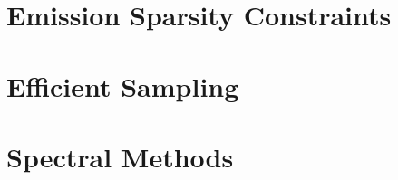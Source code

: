 \documentclass{article}
\begin{document}
\section{Emission Sparsity Constraints}

\section{Efficient Sampling}

\section{Spectral Methods}




\begin{appendix}
\begin{comment}
\section{Gradient Estimator Implementation}
In the log-semiring, addition is given by $\bigoplus = \LSE$ and multiplication
by $\bigotimes = +$.
Consider the linear chain CRF, $\bigotimes_t \psi(x_{t-1}, x_t)$,
with $\psi(x_{t-1}, t) = f(x_t) \oplus g(x_{t-1},x_t)$.
We would like to compute the gradient of the
log partition function, $A = \bigoplus_x \bigotimes_t \psi(x_{t-1}, x_t)$.
Recall the gradient identities 
\begin{equation}
\begin{aligned}
\nabla_a a \bigoplus b &= \frac{\exp(a)}{\exp(a \bigoplus b)}\\
\nabla_a a \bigotimes b &= 1.
\end{aligned}
\end{equation}

We then have 
\begin{equation}
\begin{aligned}
\nabla_{\psi(x_a,x_b)} &\bigoplus_t \psi(x_{t-1}, x_t)\\
&= \nabla_{\psi(x_a,x_b)} \bigoplus_t \psi(x_{t-1}, x_t)\\
\end{aligned}
\end{equation}
\end{comment}

\end{appendix}
\end{document}
